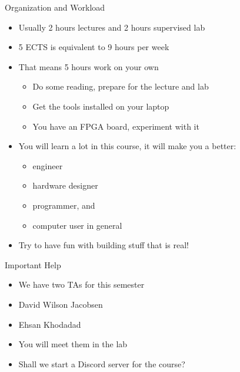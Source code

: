 \begin{frame}[fragile]{Organization and Workload}
\begin{itemize}
\item Usually 2 hours lectures and 2 hours supervised lab
\item 5 ECTS is equivalent to 9 hours per week
\item That means 5 hours work on your own
\begin{itemize}
\item Do some reading, prepare for the lecture and lab
\item Get the tools installed on your laptop
\item You have an FPGA board, experiment with it
\end{itemize}
\item You will learn a lot in this course, it will make you a better:
\begin{itemize}
\item engineer
\item hardware designer
\item programmer, and
\item computer user in general
\end{itemize}
\item Try to have fun with building stuff that is real!
\end{itemize}
\end{frame}

\begin{frame}[fragile]{Important Help}
\begin{itemize}
\item We have two TAs for this semester
\item David Wilson Jacobsen
\item Ehsan Khodadad
\item You will meet them in the lab
\item Shall we start a Discord server for the course?
\end{itemize}
\end{frame}


